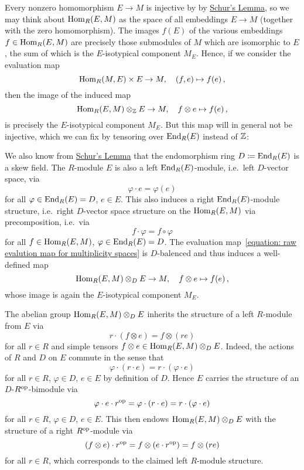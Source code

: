 \begin{fluff}
  Every nonzero homomorphism $E \to M$ is injective by by \hyperref[proposition: schurs lemma for modules]{Schur’s Lemma}, so we may think about $\operatorname{Hom}_R(E,M)$ as the space of all embeddings $E \to M$ (together with the zero homomorphism).
  The images $f(E)$ of the various embeddings $f \in \operatorname{Hom}_R(E,M)$ are precisely those submodules of $M$ which are isomorphic to $E$, the sum of which is the $E$-isotypical component $M_E$.
  Hence, if we consider the evaluation map
  \begin{equation}
    \label{equation: raw evalution map for multiplicity spaces}
            \operatorname{Hom}_R(M,E) \times E
    \to     M,
    \quad   (f, e)
    \mapsto f(e) \,,
  \end{equation}
  then the image of the induced map
  \[            
            \operatorname{Hom}_R(E,M) \otimes_{\mathbb{Z}} E
    \to     M,
    \quad   f \otimes e
    \mapsto f(e) \,,
  \]
  is precisely the $E$-isotypical component $M_E$.
  But this map will in general not be injective, which we can fix by tensoring over $\operatorname{End}_R(E)$ instead of $\mathbb{Z}$:
  
  We also know from \hyperref[proposition: schurs lemma for modules]{Schur’s Lemma} that the endomorphism ring $D \coloneqq \operatorname{End}_R(E)$ is a skew field.
  The $R$-module $E$ is also a left $\operatorname{End}_R(E)$-module, i.e.\ left $D$-vector space, via
  \[
      \varphi \cdot e
    = \varphi(e)
  \]
  for all $\varphi \in \operatorname{End}_R(E) = D$, $e \in E$.
  This also induces a right $\operatorname{End}_R(E)$-module structure, i.e.\ right $D$-vector space structure on the $\operatorname{Hom}_R(E,M)$ via precomposition, i.e.\ via
  \[
      f \cdot \varphi
    = f \circ \varphi
  \]
  for all $f \in \operatorname{Hom}_R(E,M)$, $\varphi \in \operatorname{End}_R(E) = D$.
  The evaluation map~\eqref{equation: raw evalution map for multiplicity spaces} is $D$-balenced and thus induces a well-defined map
  \[            
            \operatorname{Hom}_R(E,M) \otimes_D E
    \to     M,
    \quad   f \otimes e
    \mapsto f(e) \,,
  \]
  whose image is again the $E$-isotypical component $M_E$.
  
  The abelian group $\operatorname{Hom}_R(E,M) \otimes_D E$ inherits the structure of a left $R$-module from $E$ via
  \[
      r \cdot (f \otimes e)
    = f \otimes (r e)
  \]
  for all $r \in R$ and simple tensors $f \otimes e \in \operatorname{Hom}_R(E,M) \otimes_D E$.
  Indeed, the actions of $R$ and $D$ on $E$ commute in the sense that
  \[
      \varphi \cdot (r \cdot e)
    = r \cdot (\varphi \cdot e)
  \]
  for all $r \in R$, $\varphi \in D$, $e \in E$ by definition of $D$.
  Hence $E$ carries the structure of an $D$-$R^{\operatorname{op}}$-bimodule via
  \[
      \varphi \cdot e \cdot r^{\operatorname{op}}
    = \varphi \cdot (r \cdot e)
    = r \cdot (\varphi \cdot e)
  \]
  for all $r \in R$, $\varphi \in D$, $e \in E$.
  This then endows $\operatorname{Hom}_R(E,M) \otimes_D E$ with the structure of a right $R^{\operatorname{op}}$-module via
  \[
      (f \otimes e) \cdot r^{\operatorname{op}}
    = f \otimes (e \cdot r^{\operatorname{op}})
    = f \otimes (r e)
  \]
  for all $r \in R$, which corresponds to the claimed left $R$-module structure.
\end{fluff}


